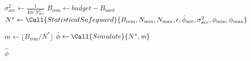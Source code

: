 \begin{algorithm}
\begin{algorithmic}

        \State
        \State $\sigma_\text{acc}^2 \gets \frac{1}{4m'N_\text{acc}^2}$
        \State $B_\text{rem} \gets \textit{budget} - B_\text{used}$
        \State $N^* \gets \Call{StatisticalSafeguard}{B_\text{rem}, N_\text{min}, N_\text{max}, \epsilon, \hat\phi_\text{acc}, \sigma_\text{acc}^2, \phi_\text{min}, \phi_\text{max}}$

        \State $m \gets \lfloor B_\text{rem} / N^*\rfloor$
        \State $\hat \phi \gets \Call{Simulate}{N^*, \textit{m}}$

        \State \Return $\hat\phi$

        \EndProcedure
    \end{algorithmic}
\end{algorithm}
